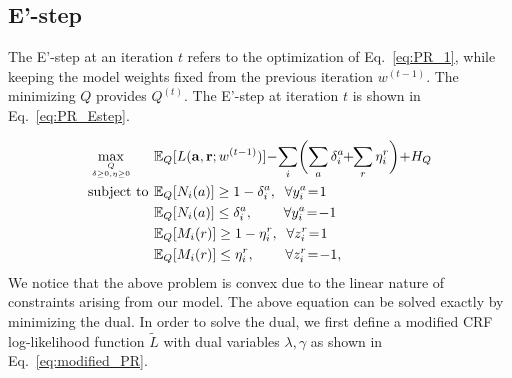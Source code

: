 \documentclass[10pt,twocolumn,letterpaper]{article}
\begin{document}
\subsection{E'-step}
The E'-step at an iteration $t$ refers to the optimization of Eq.~\ref{eq:PR_1}, while keeping the model weights fixed from the previous iteration $w^{(t-1)}$. The minimizing $Q$ provides $Q^{(t)}$. The E'-step at iteration $t$ is shown in Eq.~\ref{eq:PR_Estep}.

\vspace*{-7pt}
{\small
\begin{equation}\label{eq:PR_Estep}
\begin{aligned}
& \max \limits_{Q \atop \delta \geq 0, \eta \geq 0} \hspace*{-19pt}
& \hspace*{-14pt} &  \mathbb{E}_Q[L(\mathbf{a}, \mathbf{r}; w^{(t-1)})] \hspace*{-2pt} - \hspace*{-2pt} \sum \limits_{i} \biggl(\sum \limits_{a}  \delta_i^a \hspace*{-3pt} + \hspace*{-3pt} \sum \limits_{r}  \eta_i^r  \biggr) \hspace*{-2pt} + \hspace*{-2pt} H_{Q}\\
& \text{subject to} \hspace*{-6pt}
& & \mathbb{E}_Q [N_i(a)] \geq 1 - \delta_i^a, \;\; \forall y_i^a \hspace*{-2pt}=\hspace*{-2pt} 1 \\
&\hspace*{-3pt}&& \mathbb{E}_Q [N_i(a)] \leq \delta_i^a, \hspace*{22pt} \forall y_i^a \hspace*{-2pt}=\hspace*{-2pt} -1 \\
&\hspace*{-3pt}&& \mathbb{E}_Q [M_i(r)] \geq 1 - \eta_i^r, \;\; \forall z_i^r \hspace*{-2pt}=\hspace*{-2pt} 1 \\
&\hspace*{-3pt}&& \mathbb{E}_Q [M_i(r)] \leq \eta_i^r, \hspace*{22pt} \forall z_i^r \hspace*{-2pt}=\hspace*{-2pt} -1,
\end{aligned}
\end{equation}
}
We notice that the above problem is convex due to the linear nature of constraints arising from our model. The above equation can be solved exactly by minimizing the dual. In order to solve the dual, we first define a modified CRF log-likelihood function $\tilde{L}$ with dual variables $\lambda, \gamma$ as shown in Eq.~\ref{eq:modified_PR}.
\end{document}
